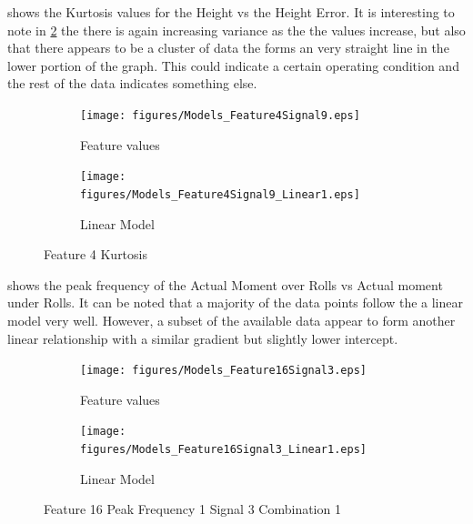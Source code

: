 \documentclass[]{article}
\begin{document}
 shows the Kurtosis values for the Height vs the Height Error. It is interesting to note in \cref{fig:Models_Feature4Signal9_Linear1} the there is again increasing variance as the the values increase, but also that there appears to be a cluster of data the forms an very straight line in the lower portion of the graph. This could indicate a certain operating condition and the rest of the data indicates something else.
\begin{figure}[H]
    \centering
		\begin{subfigure}{.5\textwidth}
		  \centering
    			\texttt{[image: figures/Models\_Feature4Signal9.eps]}
		  	\caption{Feature values}
		  	\label{fig:Models_Feature4Signal9}
		\end{subfigure}%
		\begin{subfigure}{.5\textwidth}
		  \centering
 		   	\texttt{[image: figures/Models\_Feature4Signal9\_Linear1.eps]}
		  	\caption{Linear Model}
		  	\label{fig:Models_Feature4Signal9_Linear1}
		\end{subfigure}
    \caption{Feature 4 Kurtosis}
    \label{fig:Models_Feature4Signal1_Caption}
\end{figure}


 shows the peak frequency of the Actual Moment over Rolls vs Actual moment under Rolls. It can be noted that a majority of the data points follow the a linear model very well. However, a subset of the available data appear to form another linear relationship with a similar gradient but slightly lower intercept.
\begin{figure}[H]
	\centering
	\begin{subfigure}{.5\textwidth}
		\centering
    		\texttt{[image: figures/Models\_Feature16Signal3.eps]}
	 	\caption{Feature values}
	  	\label{fig:Models_Feature16Signal3}
	\end{subfigure}%
	\begin{subfigure}{.5\textwidth}
	  \centering
 	   	\texttt{[image: figures/Models\_Feature16Signal3\_Linear1.eps]}
	  	\caption{Linear Model}
	  	\label{fig:Models_Feature16Signal3_Linear1}
	\end{subfigure}
   	\caption{Feature 16 Peak Frequency 1 Signal 3 Combination 1}
    \label{fig:Models_Feature16Signal3_Caption}
\end{figure}
\end{document}
